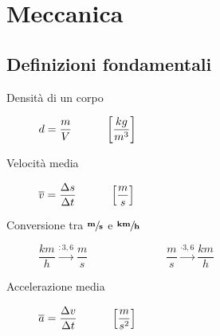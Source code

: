 \documentclass[a4paper,11pt,italian]{article}
\begin{document}
\newpage
\section{Meccanica}

\subsection{Definizioni fondamentali}

\begin{description}
  \item[Densità di un corpo] 
  $ d = \dfrac{m}{V} \hspace*{3em} \left[ \dfrac{kg}{m^3} \right] $
  
%   
  \item[Velocità media]
  $ \overline{v} = \dfrac{\Delta s}{\Delta t} \hspace*{3em} \left[ \dfrac{m}{s} \right] $
  
  \item[Conversione tra $ \sfrac{\mathbf{m}}{\mathbf{s}} $ e $ \sfrac{\mathbf{km}}{\mathbf{h}} $] $ \dfrac{km}{h} \xrightarrow{: 3,6} \dfrac{m}{s} $~~~~~~~~~~~~~~$ \dfrac{m}{s} \xrightarrow{\cdot 3,6} \dfrac{km}{h} $
  
  \item[Accelerazione media] 
  $ \overline{a} = \dfrac{\Delta v}{\Delta t} \hspace*{3em} \left[ \dfrac{m}{s^2} \right]  $
  
\end{description}
\end{document}

